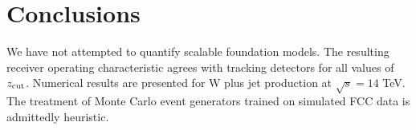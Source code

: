 \section{Conclusions}\label{sec:conclusions}

We have not attempted to quantify scalable foundation models. The
resulting receiver operating characteristic agrees with tracking
detectors for all values of $z_{\rm cut}$. Numerical results are
presented for W plus jet production at $\sqrt{s} = 14$ TeV. The
treatment of Monte Carlo event generators trained on simulated FCC data
is admittedly heuristic.


